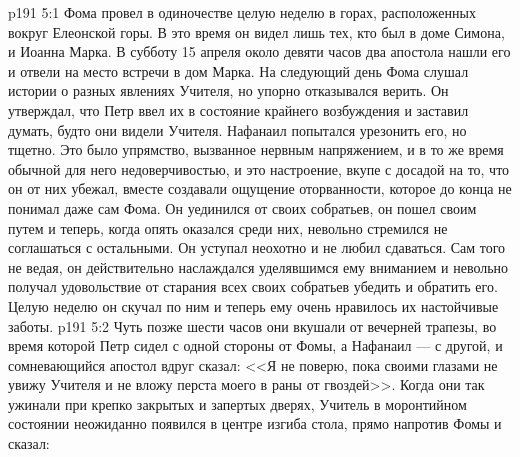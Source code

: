 \vs p191 5:1 Фома провел в одиночестве целую неделю в горах, расположенных вокруг Елеонской горы. В это время он видел лишь тех, кто был в доме Симона, и Иоанна Марка. В субботу 15 апреля около девяти часов два апостола нашли его и отвели на место встречи в дом Марка. На следующий день Фома слушал истории о разных явлениях Учителя, но упорно отказывался верить. Он утверждал, что Петр ввел их в состояние крайнего возбуждения и заставил думать, будто они видели Учителя. Нафанаил попытался урезонить его, но тщетно. Это было упрямство, вызванное нервным напряжением, и в то же время обычной для него недоверчивостью, и это настроение, вкупе с досадой на то, что он от них убежал, вместе создавали ощущение оторванности, которое до конца не понимал даже сам Фома. Он уединился от своих собратьев, он пошел своим путем и теперь, когда опять оказался среди них, невольно стремился не соглашаться с остальными. Он уступал неохотно и не любил сдаваться. Сам того не ведая, он действительно наслаждался уделявшимся ему вниманием и невольно получал удовольствие от старания всех своих собратьев убедить и обратить его. Целую неделю он скучал по ним и теперь ему очень нравилось их настойчивые заботы.
\vs p191 5:2 Чуть позже шести часов они вкушали от вечерней трапезы, во время которой Петр сидел с одной стороны от Фомы, а Нафанаил --- с другой, и сомневающийся апостол вдруг сказал: <<Я не поверю, пока своими глазами не увижу Учителя и не вложу перста моего в раны от гвоздей>>. Когда они так ужинали при крепко закрытых и запертых дверях, Учитель в моронтийном состоянии неожиданно появился в центре изгиба стола, прямо напротив Фомы и сказал:
